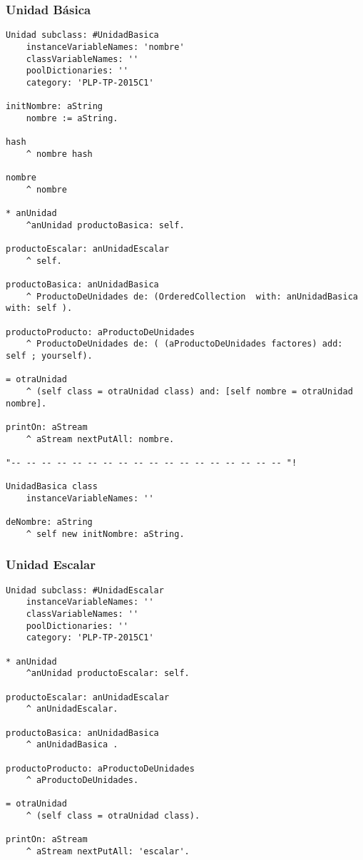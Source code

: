 \subsubsection{Unidad B\'asica}
\begin{lstlisting}
Unidad subclass: #UnidadBasica
	instanceVariableNames: 'nombre'
	classVariableNames: ''
	poolDictionaries: ''
	category: 'PLP-TP-2015C1'

initNombre: aString 
	nombre := aString.

hash
	^ nombre hash

nombre
	^ nombre

* anUnidad
	^anUnidad productoBasica: self.

productoEscalar: anUnidadEscalar 
	^ self.

productoBasica: anUnidadBasica
	^ ProductoDeUnidades de: (OrderedCollection  with: anUnidadBasica with: self ).

productoProducto: aProductoDeUnidades 
	^ ProductoDeUnidades de: ( (aProductoDeUnidades factores) add: self ; yourself).

= otraUnidad
	^ (self class = otraUnidad class) and: [self nombre = otraUnidad nombre].

printOn: aStream 
	^ aStream nextPutAll: nombre.

"-- -- -- -- -- -- -- -- -- -- -- -- -- -- -- -- -- -- "!

UnidadBasica class
	instanceVariableNames: ''

deNombre: aString 
	^ self new initNombre: aString.

\end{lstlisting}
\vspace{5mm}

\subsubsection{Unidad Escalar}
\begin{lstlisting}
Unidad subclass: #UnidadEscalar
	instanceVariableNames: ''
	classVariableNames: ''
	poolDictionaries: ''
	category: 'PLP-TP-2015C1'

* anUnidad
	^anUnidad productoEscalar: self.

productoEscalar: anUnidadEscalar 
	^ anUnidadEscalar.

productoBasica: anUnidadBasica 
	^ anUnidadBasica .

productoProducto: aProductoDeUnidades 
	^ aProductoDeUnidades.

= otraUnidad
	^ (self class = otraUnidad class).

printOn: aStream 
	^ aStream nextPutAll: 'escalar'.

\end{lstlisting}
\vspace{5mm}


